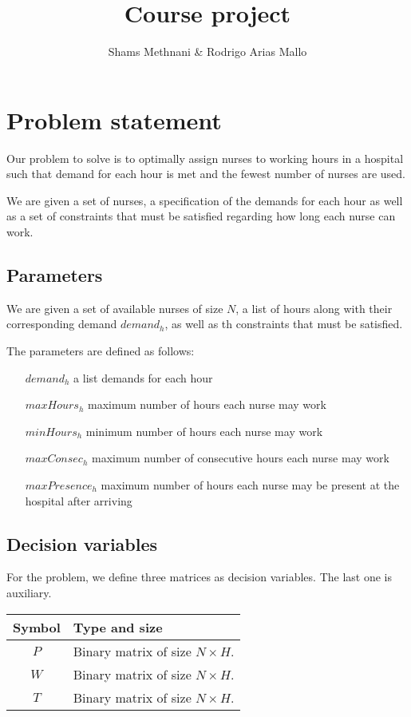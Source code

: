 \documentclass[12pt,a4paper]{article}
\title{Course project}
\author{Shams Methnani \& Rodrigo Arias Mallo}
\begin{document}
\maketitle

\section{Problem statement}


Our problem to solve is to optimally assign nurses to working hours in a hospital such that demand for each hour is met and the fewest number of nurses are used.

We are given a set of nurses, a specification of the demands for each hour as well as a set of constraints that must be satisfied regarding how long each nurse can work.

\subsection{Parameters}


We are given a set of available nurses of size $N$, a list of hours along with their corresponding demand ${demand}_h$, as well as th constraints that must be satisfied.

The parameters are defined as follows:
    \begin{enumerate}
    \paragraph{}
        \item [${demand}_h$] a list demands for each hour
        \item [${maxHours}_h$] maximum number of hours each nurse may work
        \item [${minHours}_h$] minimum number of hours each nurse may work
        \item [${maxConsec}_h$] maximum number of consecutive hours each nurse may work
        \item [${maxPresence}_h$] maximum number of hours each nurse may be present at the hospital after arriving
    \end{enumerate}
%
\subsection{Decision variables}

For the problem, we define three matrices as decision variables. The last one is
auxiliary.
%
\begin{table}[h]
\centering
\begin{tabular}{c l}
\toprule
Symbol & Type and size \\
\midrule
$P$ & Binary matrix of size $N \times H$.\\
$W$ & Binary matrix of size $N \times H$.\\
$T$ & Binary matrix of size $N \times H$.\\
\bottomrule
\end{tabular}
\end{table}
\end{document}
